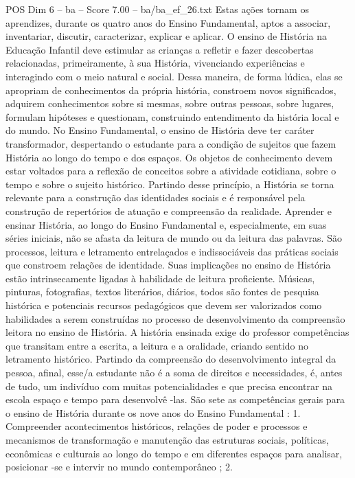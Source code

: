 \begin{textsample}{POS Dim 6 – ba – Score 7.00 – ba/ba\_ef\_26.txt}
Estas ações tornam os aprendizes, durante os quatro anos do Ensino Fundamental, aptos a associar, inventariar, discutir, caracterizar, explicar e aplicar.
O ensino de História na Educação Infantil deve estimular as crianças a refletir e fazer descobertas relacionadas, primeiramente, à sua História, vivenciando experiências e interagindo com o meio natural e social.
Dessa maneira, de forma lúdica, elas se apropriam de conhecimentos da própria história, constroem novos significados, adquirem conhecimentos sobre si mesmas, sobre outras pessoas, sobre lugares, formulam hipóteses e questionam, construindo entendimento da história local e do mundo.
No Ensino Fundamental, o ensino de História deve ter caráter transformador, despertando o estudante para a condição de sujeitos que fazem História ao longo do tempo e dos espaços.
Os objetos de conhecimento devem estar voltados para a reflexão de conceitos sobre a atividade cotidiana, sobre o tempo e sobre o sujeito histórico.
Partindo desse princípio, a História se torna relevante para a construção das identidades sociais e é responsável pela construção de repertórios de atuação e compreensão da realidade.
Aprender e ensinar História, ao longo do Ensino Fundamental e, especialmente, em suas séries iniciais, não se afasta da leitura de mundo ou da leitura das palavras.
São processos, leitura e letramento entrelaçados e indissociáveis das práticas sociais que constroem relações de identidade.
Suas implicações no ensino de História estão intrinsecamente ligadas à habilidade de leitura proficiente.
Músicas, pinturas, fotografias, textos literários, diários, todos são fontes de pesquisa histórica e potenciais recursos pedagógicos que devem ser valorizados como habilidades a serem construídas no processo de desenvolvimento da compreensão leitora no ensino de História.
A história ensinada exige do professor competências que transitam entre a escrita, a leitura e a oralidade, criando sentido no letramento histórico.
Partindo da compreensão do desenvolvimento integral da pessoa, afinal, esse/a estudante não é a soma de direitos e necessidades, é, antes de tudo, um indivíduo com muitas potencialidades e que precisa encontrar na escola espaço e tempo para desenvolvê -las.
São sete as competências gerais para o ensino de História durante os nove anos do Ensino Fundamental : 1.
Compreender acontecimentos históricos, relações de poder e processos e mecanismos de transformação e manutenção das estruturas sociais, políticas, econômicas e culturais ao longo do tempo e em diferentes espaços para analisar, posicionar -se e intervir no mundo contemporâneo ; 2.

\end{textsample}
